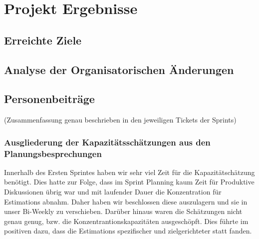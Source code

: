 
\chapter{Projekt Ergebnisse}

\section{Erreichte Ziele}

\section{Analyse der Organisatorischen Änderungen}
\section{Personenbeiträge}
(Zusammenfassung genau beschrieben in den jeweiligen Tickets der Sprints)

\subsection{Ausgliederung der Kapazitätsschätzungen aus den Planungsbesprechungen}

Innerhalb des Ersten Sprintes haben wir sehr viel Zeit für die Kapazitätschätzung benötigt. 
Dies hatte zur Folge, dass im Sprint Planning kaum Zeit für Produktive Diskussionen übrig war und mit laufender Dauer die Konzentration für Estimations abnahm.
Daher haben wir beschlossen diese auszulagern und sie in unser Bi-Weekly zu verschieben.
Darüber hinaus waren die Schätzungen nicht genau genug, bzw. die Konzentrantionskapazitäten ausgeschöpft.
Dies führte im positiven dazu, dass die Estimations spezifischer und zielgerichteter statt fanden.